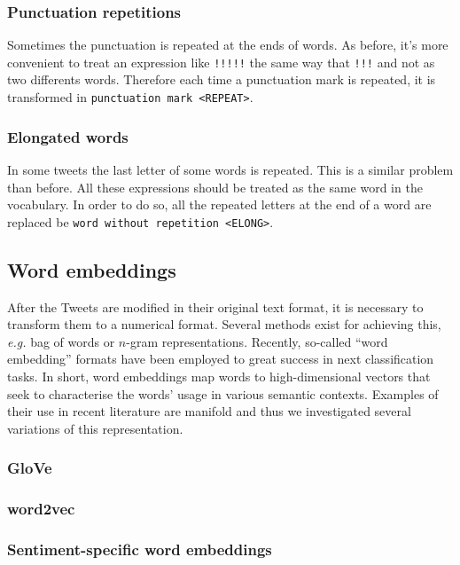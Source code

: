 \subsubsection{Punctuation repetitions}
Sometimes the punctuation is repeated at the ends of words. As before, it's more convenient to treat an expression like \texttt{!!!!!} the same way that \texttt{!!!} and not as two differents words. Therefore each time a punctuation mark is repeated, it is transformed in \texttt{punctuation mark <REPEAT>}. 

\subsubsection{Elongated words}
In some tweets the last letter of some words is repeated. This is a similar problem than before. All these expressions should be treated as the same word in the vocabulary. In order to do so, all the repeated letters at the end of a word are replaced be \texttt{word without repetition <ELONG>}.

\subsection{Word embeddings}
After the Tweets are modified in their original text format, it is necessary to transform them to a numerical format. Several methods exist for achieving this, \emph{e.g.} bag of words or $n$-gram representations. Recently, so-called ``word embedding'' formats \cite{} have been employed to great success in next classification tasks. In short, word embeddings map words to high-dimensional vectors that seek to characterise the words' usage in various semantic contexts. \cite{} Examples of their use in recent literature are manifold \cite{} and thus we investigated several variations of this representation.

\subsubsection{GloVe}

\subsubsection{word2vec}

\subsubsection{Sentiment-specific word embeddings}
